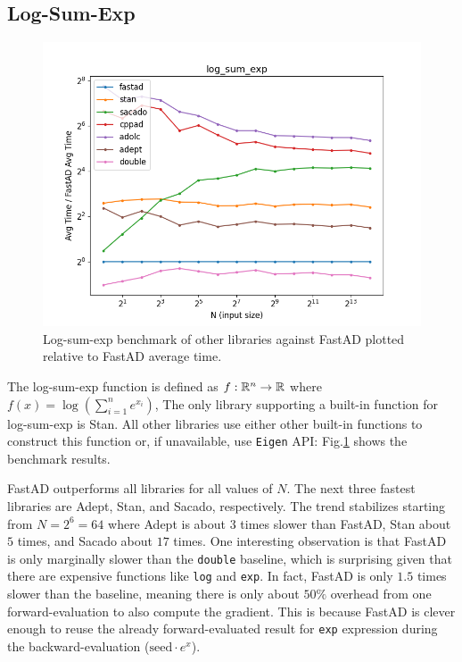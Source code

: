 \subsection{Log-Sum-Exp}

\begin{figure}[t]
    \centering
    \includegraphics[width=\textwidth]{figs/log_sum_exp_fig.png}
    \caption{%
        Log-sum-exp benchmark of other libraries against FastAD 
        plotted relative to FastAD average time.
    }\label{fig:log_sum_exp}
\end{figure}

The log-sum-exp function is defined as $f:\mathbb{R}^n \to \mathbb{R}$ 
where~$f(x) = \log(\sum\limits_{i=1}^n e^{x_i})$,
The only library supporting a built-in function for log-sum-exp is Stan.
All other libraries use either other built-in functions to construct this function or,
if unavailable, use \verb|Eigen| API:\@
Fig.\ref{fig:log_sum_exp} shows the benchmark results.

FastAD outperforms all libraries for all values of $N$.
The next three fastest libraries are Adept, Stan, and Sacado, respectively.
The trend stabilizes starting from $N=2^6=64$ where 
Adept is about $ 3$ times slower than FastAD, 
Stan about $ 5$ times, and 
Sacado about $ 17$ times.
One interesting observation is that FastAD is only marginally slower than the \verb|double| baseline,
which is surprising given that there are expensive functions like \verb|log| and \verb|exp|.
In fact, FastAD is only $ 1.5$ times slower than the baseline, meaning there is only about $ 50\%$
overhead from one forward-evaluation to also compute the gradient.
This is because FastAD is clever enough to reuse 
the already forward-evaluated result for \verb|exp| expression
during the backward-evaluation ($\text{seed} \cdot e^x$).
